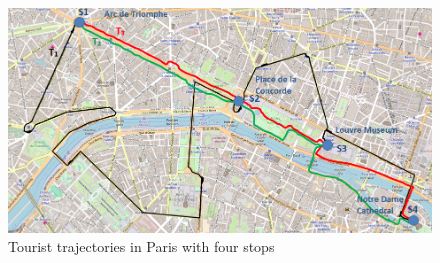 \documentclass[12pt]{article}
\begin{document}
\begin{figure}[h]
\label{fig:Paris}
\centering
\includegraphics[width=1.0\textwidth]{Images/paris5.png}
\caption{Tourist trajectories in Paris with four stops}
\end{figure}
\end{document}
